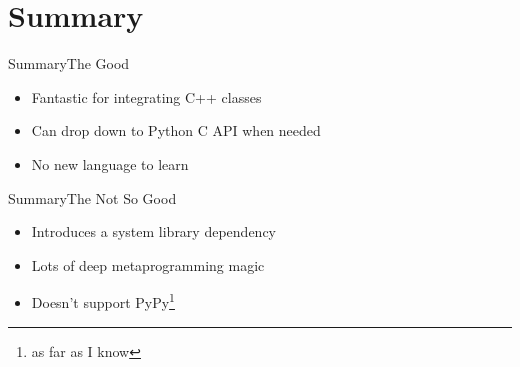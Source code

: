 \documentclass{beamer}
\begin{document}
\section*{Summary}

\begin{frame}[<+->]{Summary}{The Good}
  \begin{itemize}
    \item Fantastic for integrating C++ classes
    \item Can drop down to Python C API when needed
    \item No new language to learn
  \end{itemize}
\end{frame}

\begin{frame}[<+->]{Summary}{The Not So Good}
  \begin{itemize}
    \item Introduces a system library dependency
    \item Lots of deep metaprogramming magic
    \item Doesn't support PyPy\footnote{as far as I know}
  \end{itemize}
\end{frame}
\end{document}
